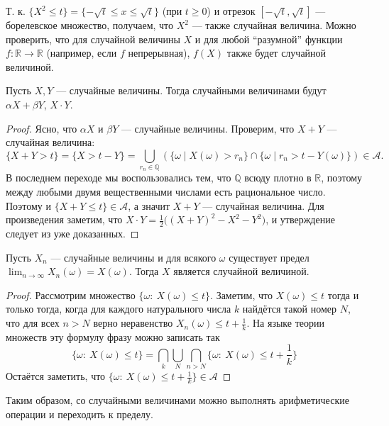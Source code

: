 \begin{comment*}
    Т. к. $\{ X^2 \leqslant t \} = \{-\sqrt{t} \leqslant x \leqslant \sqrt{t}\}$ (при $t \geq 0$) и отрезок $[-\sqrt{t}, \sqrt{t}]$ --- борелевское множество, получаем, что $X^2$ --- также случайная величина.
    Можно проверить, что для случайной величины $X$ и для любой \enquote{разумной} функции $f\colon \mathbb{R}\to \mathbb{R}$
    (например, если $f$ непрерывная), $f(X)$ также будет случайной величиной.
\end{comment*}

\begin{proposal*}
    Пусть $X, Y$ --- случайные величины.
    Тогда случайными величинами будут $\alpha X + \beta Y$, $X \cdot Y$.
\end{proposal*}

\begin{proof}
    Ясно, что $\alpha X$ и $\beta Y$ --- случайные величины.
    Проверим, что $X + Y$ --- случайная величина:
    \[
        \{X+Y > t\} = \{ X > t - Y\} = \bigcup\limits_{r_n \in \mathbb{Q}}(\{\omega \mid X(\omega) > r_n\} \cap \{\omega \mid r_n > t - Y(\omega)\}) \in \mathcal{A}.
    \]
    В последнем переходе мы воспользовались тем, что $\mathbb{Q}$ всюду плотно в $\mathbb{R}$, поэтому между любыми двумя вещественными числами есть рациональное число.
    Поэтому и $\{X + Y \leqslant t\} \in \mathcal{A}$, а значит $X + Y$ --- случайная величина.
    Для произведения заметим, что $X \cdot Y = \frac{1}{2}\bigl((X + Y)^2 - X^2 - Y^2\bigr)$, и утверждение следует из уже доказанных.
\end{proof}

\begin{proposal*}
    Пусть $X_n$ --- случайные величины и для всякого $\omega$ существует предел $\lim_{n \to \infty} X_n(\omega) = X(\omega)$.
    Тогда $X$ является случайной величиной.
\end{proposal*}

\begin{proof}
    Рассмотрим множество $\{\omega \colon ~ X(\omega) \leqslant t\}$. Заметим, что $X(\omega) \leqslant t$ тогда и только тогда,
    когда для каждого натурального числа $k$ найдётся такой номер $N$, что для всех $n > N$ верно неравенство $X_n(\omega)
    \leqslant t + \frac{1}{k}$. На языке теории множеств эту формулу фразу можно записать так
    \[
        \{\omega \colon ~ X(\omega) \leqslant t\} = \bigcap_k \bigcup_N \bigcap_{n > N} \{\omega \colon ~ X(\omega) \leqslant t + \frac{1}{k}\}
    \]
    Остаётся заметить, что $\{\omega \colon ~ X(\omega) \leqslant t + \frac{1}{k}\} \in \mathcal{A}$
\end{proof}

Таким образом, со случайными величинами можно выполнять арифметические операции и переходить к пределу.